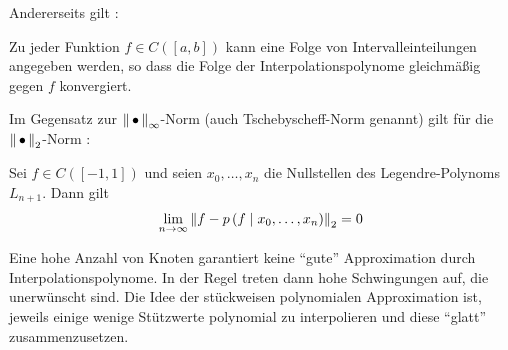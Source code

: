 Andererseits gilt \cite[siehe][]{haemmerlinhoffmann}:
\begin{Satze}[Marcinkiewicz]
  Zu jeder Funktion $f\in C([a,b])$ kann eine Folge von
  Intervalleinteilungen angegeben werden,
  so dass die Folge der Interpolationspolynome gleichmäßig gegen $f$ konvergiert.
\end{Satze}

Im Gegensatz zur $\nn_\infty$-Norm (auch Tschebyscheff-Norm genannt)
gilt für die $\nn_2$-Norm \cite[siehe][]{haemmerlinhoffmann}:
\begin{Satze}
  Sei $f\in C([-1,1])$ und seien $x_0,\dotsc, x_n$ die Nullstellen
  des	Legendre-Polynoms $L_{n+1}$. Dann gilt
  \begin{gather*}
    \lim\limits_{n\rightarrow \infty}\nn[f-\ipol{p}{f}{x_0,\dotsc,x_n}]_2 = 0
  \end{gather*}
\end{Satze}


Eine hohe Anzahl von Knoten garantiert keine \enquote{gute}
Approximation durch Interpolationspolynome.
In der Regel treten dann hohe Schwingungen auf,
die unerwünscht sind.
Die Idee der stückweisen polynomialen Approximation ist,
jeweils einige wenige Stützwerte polynomial zu interpolieren
und diese \enquote{glatt} zusammenzusetzen.

